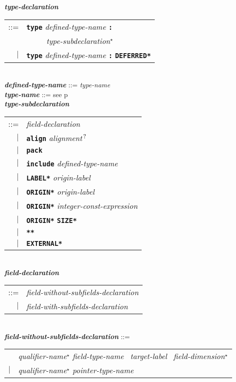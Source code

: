 \documentclass[12pt]{article}
\newcommand{\TT}[1]{{\tt \bfseries #1}}
\newcommand{\STAR}{{\Large $^\star$}}
\newcommand{\QMARK}{{$^{\,\mbox{\footnotesize ?}}$}}
\newcommand{\ttkey}[1]{{\tt \bfseries #1}}
\newcommand{\emkey}[1]{{\em \bfseries #1}}
\newcommand{\pagref}[1]{p\pageref{#1}}
\newenvironment{indpar}[1][0.3in]%
	{\begin{list}{}%
		     {\setlength{\itemsep}{0in}%
		      \setlength{\topsep}{0in}%
		      \setlength{\parsep}{1ex}%
		      \setlength{\labelwidth}{#1}%
		      \setlength{\leftmargin}{#1}%
		      \addtolength{\leftmargin}{\labelsep}}%
	 \item}%
	{\end{list}}
\begin{document}
\begin{indpar}
\emkey{type-declaration}\label{TYPE-DECLARATION}
    \begin{tabular}[t]{rl}
    ::= & \ttkey{type} {\em defined-type-name} \TT{:} \\
	& \TT{~~~~~}{\em type-subdeclaration}\STAR{} \\
    $|$ & \ttkey{type} {\em defined-type-name} \TT{:} \ttkey{*DEFERRED*} \\
    \end{tabular} \\
\emkey{defined-type-name} ::= {\em type-name} \\
\emkey{type-name} ::= see \pagref{TYPE-NAME}
\\[2ex]
\emkey{type-subdeclaration}
    \begin{tabular}[t]{@{}rl}
    ::= &  {\em field-declaration} \\
    $|$ &  \ttkey{align} {\em alignment}\QMARK{} \\
    $|$ &  \ttkey{pack} \\
    $|$ &  \ttkey{include} {\em defined-type-name} \\
    $|$ &  \ttkey{*LABEL*} {\em origin-label} \\
    $|$ &  \ttkey{*ORIGIN*} {\em origin-label} \\
    $|$ &  \ttkey{*ORIGIN*} {\em integer-const-expression} \\
    $|$ &  \ttkey{*ORIGIN*} \ttkey{*SIZE*} \\
    $|$ &  \ttkey{***} \\
    $|$ &  \ttkey{*EXTERNAL*} \\
    \end{tabular}
\\[2ex]
\emkey{field-declaration}
    \begin{tabular}[t]{@{}rl}
    ::= &  {\em field-without-subfields-declaration} \\
    $|$ &  {\em field-with-subfields-declaration} \\
    \end{tabular}
\\[2ex]
\emkey{field-without-subfields-declaration} ::= \\
\hspace*{0.5in}\begin{tabular}{rl}
        & {\em qualifier-name}\STAR{} {\em field-type-name}~
          {\em target-label}~ {\em field-dimension}\STAR{} \\
    $|$ & {\em qualifier-name}\STAR{} {\em pointer-type-name} \\

\end{tabular}
\end{indpar}
\end{document}
